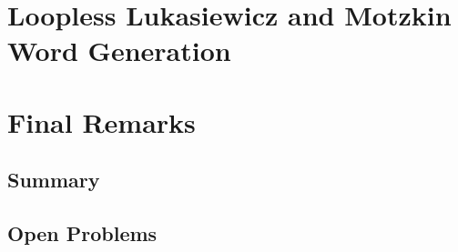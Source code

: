 \chapter{Loopless Lukasiewicz and Motzkin Word Generation} \label{chap:luka-implementation}


\chapter{Final Remarks}
\section{Summary}
\section{Open Problems}





